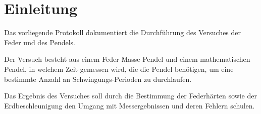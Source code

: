 \section{Einleitung}
Das vorliegende Protokoll dokumentiert die Durchführung des Versuches der Feder und des Pendels.

Der Versuch besteht aus einem Feder-Masse-Pendel und einem mathematischen Pendel, in welchem Zeit gemessen wird, die die Pendel benötigen, um eine bestimmte Anzahl an Schwingungs-Perioden zu durchlaufen.

Das Ergebnis des Versuches soll durch die Bestimmung der Federhärten sowie der Erdbeschleunigung den Umgang mit Messergebnissen und deren Fehlern schulen.